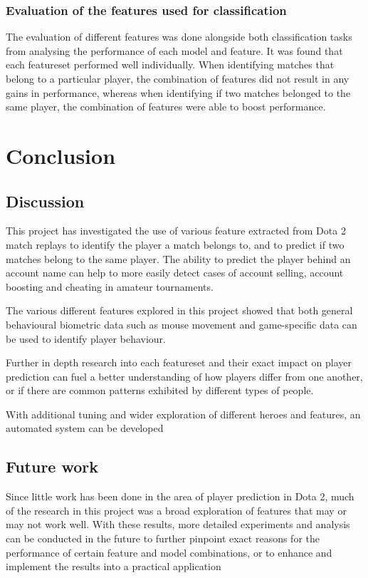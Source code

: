\documentclass[Report.tex]{subfiles}
\begin{document}
\subsubsection{Evaluation of the features used for classification}
The evaluation of different features was done alongside both classification tasks from analysing the performance of each model and feature. It was found that each featureset performed well individually. When identifying matches that belong to a particular player, the combination of features did not result in any gains in performance, whereas when identifying if two matches belonged to the same player, the combination of features were able to boost performance. 


\section{Conclusion}

\subsection{Discussion}
This project has investigated the use of various feature extracted from Dota 2 match replays to identify the player a match belongs to, and to predict if two matches belong to the same player. The ability to predict the player behind an account name can help to more easily detect cases of account selling, account boosting and cheating in amateur tournaments. 

The various different features explored in this project showed that both general behavioural biometric data such as mouse movement and game-specific 
data can be used to identify player behaviour. 

Further in depth research into each featureset and their exact impact on player prediction can fuel a better understanding of how players differ from one another, or if there are common patterns exhibited by different types of people. 

With additional tuning and wider exploration of different heroes and features, an automated system can be developed 




\subsection{Future work}
Since little work has been done in the area of player prediction in Dota 2, much of the research in this project was a broad exploration of features that may or may not work well. With these results, more detailed experiments and analysis can be conducted in the future to further pinpoint exact reasons for the performance of certain feature and model combinations, or to enhance and implement the results into a practical application
\end{document}

